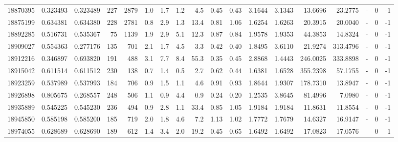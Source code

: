 \begin{tabular}{rrrrrrrrrrrrrrrlrr}
  18870395 & 0.323493 &   0.323489 &  227 & 2879 &      1.0 &      1.7 &     1.2 &      4.5 &       0.45 &        0.43 &  3.1644 &  3.1343 &   13.6696 &   23.2775 &             - &        0 &         -1 \\
  18875199 & 0.634381 &   0.634380 &  228 & 2781 &      0.8 &      2.9 &     1.3 &     13.4 &       0.81 &        1.06 &  1.6254 &  1.6263 &   20.3915 &   20.0040 &             - &        0 &         -1 \\
  18892285 & 0.516731 &   0.535367 &   75 & 1139 &      1.9 &      2.9 &     5.1 &     12.3 &       0.87 &        0.84 &  1.9578 &  1.9353 &   44.3853 &   14.8324 &             - &        0 &         -1 \\
  18909027 & 0.554363 &   0.277176 &  135 &  701 &      2.1 &      1.7 &     4.5 &      3.3 &       0.42 &        0.40 &  1.8495 &  3.6110 &   21.9274 &  313.4796 &             - &        0 &         -1 \\
  18912216 & 0.346897 &   0.693820 &  191 &  488 &      3.1 &      7.7 &     8.4 &     55.3 &       0.35 &        0.45 &  2.8868 &  1.4443 &  246.0025 &  333.8898 &             - &        0 &         -1 \\
  18915042 & 0.611514 &   0.611512 &  230 &  138 &      0.7 &      1.4 &     0.5 &      2.7 &       0.62 &        0.44 &  1.6381 &  1.6528 &  355.2398 &   57.1755 &             - &        0 &         -1 \\
  18923259 & 0.537989 &   0.537993 &  184 &  706 &      0.9 &      1.5 &     1.1 &      4.6 &       0.91 &        0.93 &  1.8644 &  1.9307 &  178.7310 &   13.8947 &             - &        0 &         -1 \\
  18926898 & 0.805675 &   0.268557 &  248 &  506 &      1.1 &      0.9 &     4.4 &      0.9 &       0.24 &        0.20 &  1.2535 &  3.8645 &   81.4996 &    7.0980 &             - &        0 &         -1 \\
  18935889 & 0.545225 &   0.545230 &  236 &  494 &      0.9 &      2.8 &     1.1 &     33.4 &       0.85 &        1.05 &  1.9184 &  1.9184 &   11.8631 &   11.8554 &             - &        0 &         -1 \\
  18945850 & 0.585198 &   0.585200 &  185 &  719 &      2.0 &      1.8 &     4.6 &      7.2 &       1.13 &        1.02 &  1.7772 &  1.7679 &   14.6327 &   16.9147 &             - &        0 &         -1 \\
  18974055 & 0.628689 &   0.628690 &  189 &  612 &      1.4 &      3.4 &     2.0 &     19.2 &       0.45 &        0.65 &  1.6492 &  1.6492 &   17.0823 &   17.0576 &             - &        0 &         -1 \\

\end{tabular}
